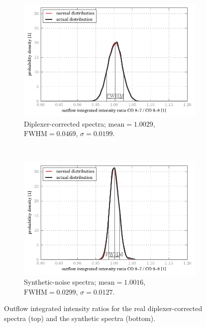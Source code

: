 \begin{figure}
    \centering
    \begin{subfigure}[0]{\textwidth}
        \centering
        \includegraphics[width=\textwidth]{ratios_outflow_corrected}
        \caption{Diplexer-corrected spectra;
        $\text{mean}=1.0029$, $\text{FWHM}=0.0469$, $\sigma=0.0199$.}
    \end{subfigure}
    \\
    \begin{subfigure}[0]{\textwidth}
        \centering
        \includegraphics[width=\textwidth]{ratios_outflow_noisy}
        \caption{Synthetic-noise spectra;
        $\text{mean}=1.0016$, $\text{FWHM}=0.0299$, $\sigma=0.0127$.}
    \end{subfigure}
    \caption{
        Outflow integrated intensity ratios for the real diplexer-corrected spectra (top)
        and the synthetic spectra (bottom).
    }
    \label{fig:ratio_outflow}
\end{figure}






